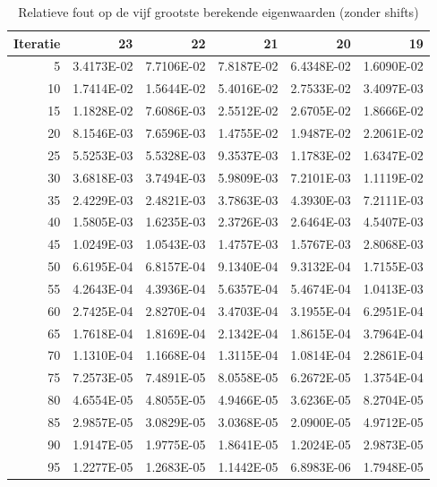 \documentclass[a4paper, 12pt, titlepage]{report}
\begin{document}
\begin{center}
\begin{table}

\begin{tabular}{r||r|r|r|r|r}

Iteratie & 23 & 22& 21&20&19 \\
\hline
5	&	3.4173E-02	&	7.7106E-02	&	7.8187E-02	&	6.4348E-02	&	1.6090E-02	\\
10	&	1.7414E-02	&	1.5644E-02	&	5.4016E-02	&	2.7533E-02	&	3.4097E-03	\\
15	&	1.1828E-02	&	7.6086E-03	&	2.5512E-02	&	2.6705E-02	&	1.8666E-02	\\
20	&	8.1546E-03	&	7.6596E-03	&	1.4755E-02	&	1.9487E-02	&	2.2061E-02	\\
25	&	5.5253E-03	&	5.5328E-03	&	9.3537E-03	&	1.1783E-02	&	1.6347E-02	\\
30	&	3.6818E-03	&	3.7494E-03	&	5.9809E-03	&	7.2101E-03	&	1.1119E-02	\\
35	&	2.4229E-03	&	2.4821E-03	&	3.7863E-03	&	4.3930E-03	&	7.2111E-03	\\
40	&	1.5805E-03	&	1.6235E-03	&	2.3726E-03	&	2.6464E-03	&	4.5407E-03	\\
45	&	1.0249E-03	&	1.0543E-03	&	1.4757E-03	&	1.5767E-03	&	2.8068E-03	\\
50	&	6.6195E-04	&	6.8157E-04	&	9.1340E-04	&	9.3132E-04	&	1.7155E-03	\\
55	&	4.2643E-04	&	4.3936E-04	&	5.6357E-04	&	5.4674E-04	&	1.0413E-03	\\
60	&	2.7425E-04	&	2.8270E-04	&	3.4703E-04	&	3.1955E-04	&	6.2951E-04	\\
65	&	1.7618E-04	&	1.8169E-04	&	2.1342E-04	&	1.8615E-04	&	3.7964E-04	\\
70	&	1.1310E-04	&	1.1668E-04	&	1.3115E-04	&	1.0814E-04	&	2.2861E-04	\\
75	&	7.2573E-05	&	7.4891E-05	&	8.0558E-05	&	6.2672E-05	&	1.3754E-04	\\
80	&	4.6554E-05	&	4.8055E-05	&	4.9466E-05	&	3.6236E-05	&	8.2704E-05	\\
85	&	2.9857E-05	&	3.0829E-05	&	3.0368E-05	&	2.0900E-05	&	4.9712E-05	\\
90	&	1.9147E-05	&	1.9775E-05	&	1.8641E-05	&	1.2024E-05	&	2.9873E-05	\\
95	&	1.2277E-05	&	1.2683E-05	&	1.1442E-05	&	6.8983E-06	&	1.7948E-05	\\

\end{tabular}
\caption{Relatieve fout op de vijf grootste berekende eigenwaarden (zonder shifts)}
\label{errorNoShift}
\end{table}
\end{center}
\end{document}
